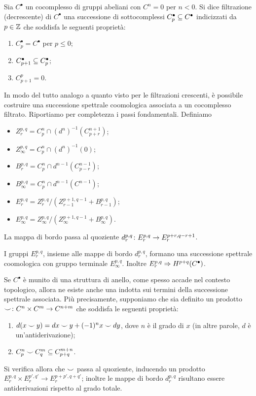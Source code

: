 \begin{definition}
Sia $C^\bullet$ un cocomplesso di gruppi abeliani con $C^n=0$ per $n<0$. Si dice filtrazione (decrescente) di $C^\bullet$ una successione di sottocomplessi $C_p^\bullet\subseteq C^\bullet$ indicizzati da $p\in\mathbb{Z}$ che soddisfa le seguenti proprietà:
\begin{enumerate}
\item $C_p^\bullet=C^\bullet$ per $p\le 0$;
\item $C_{p+1}^\bullet\subseteq C_p^\bullet$;
\item $C^p_{p+1}=0$.
\end{enumerate}
\end{definition}
In modo del tutto analogo a quanto visto per le filtrazioni crescenti, è possibile costruire una successione spettrale coomologica associata a un cocomplesso filtrato. Riportiamo per completezza i passi fondamentali. Definiamo
\begin{itemize}
\item $Z^{p,q}_r=C_p^n\cap (d^n)^{-1}(C_{p+r}^{n+1})$;
\item $Z^{p,q}_\infty=C_p^n\cap(d^n)^{-1}(0)$;
\item $B^{p,q}_r=C_p^n\cap d^{n-1}(C_{p-r}^{n-1})$;
\item $B^{p,q}_\infty=C_p^n\cap d^{n-1}(C^{n-1})$;
\item $E^{p,q}_r=Z^{p,q}_r/(Z^{p+1,q-1}_{r-1}+B^{p,q}_{r-1})$;
\item $E^{p,q}_\infty=Z^{p,q}_\infty/(Z^{p+1,q-1}_{\infty}+B^{p,q}_\infty)$.
\end{itemize}
La mappa di bordo passa al quoziente $d^{p,q}_r\colon E^{p,q}_r\to E^{p+r,q-r+1}_r$.
\begin{proposition}
I gruppi $E^{p,q}_r$, insieme alle mappe di bordo $d^{p,q}_r$, formano una successione spettrale coomologica con gruppo terminale $E^{p,q}_\infty$. Inoltre $E^{p,q}_r\Rightarrow H^{p+q}(C^\bullet)$.
\end{proposition}
Se $C^\bullet$ è munito di una struttura di anello, come spesso accade nel contesto topologico, allora ne esiste anche una indotta sui termini della successione spettrale associata. Più precisamente, supponiamo che sia definito un prodotto $\mathbin{\smile}\colon C^n\times C^m\to C^{n+m}$ che soddisfa le seguenti proprietà:
\begin{enumerate}
\item $d(x\mathbin{\smile} y)=dx\mathbin{\smile} y+(-1)^nx\mathbin{\smile} dy$, dove $n$ è il grado di $x$ (in altre parole, $d$ è un'antiderivazione);
\item $C^n_p\mathbin{\smile} C^m_q\subseteq C^{m+n}_{p+q}$.
\end{enumerate}
Si verifica  allora che $\mathbin{\smile}$ passa al quoziente, inducendo un prodotto $E^{p,q}_r\times E^{p',q'}_r\to E^{p+p',q+q'}_r$; inoltre le mappe di bordo $d^{p,q}_r$ risultano essere antiderivazioni rispetto al grado totale.

